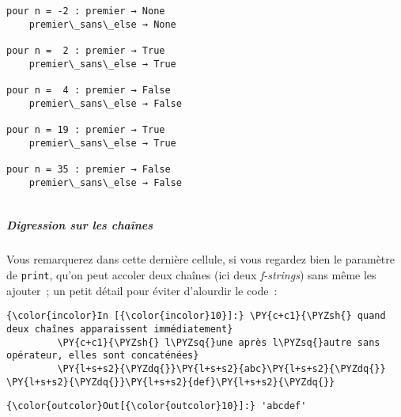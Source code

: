     \begin{Verbatim}[commandchars=\\\{\}]
pour n = -2 : premier → None
    premier\_sans\_else → None

pour n =  2 : premier → True
    premier\_sans\_else → True

pour n =  4 : premier → False
    premier\_sans\_else → False

pour n = 19 : premier → True
    premier\_sans\_else → True

pour n = 35 : premier → False
    premier\_sans\_else → False


    \end{Verbatim}

    \hypertarget{digression-sur-les-chauxeenes}{%
\subparagraph{Digression sur les
chaînes}\label{digression-sur-les-chauxeenes}}

    Vous remarquerez dans cette dernière cellule, si vous regardez bien le
paramètre de \texttt{print}, qu'on peut accoler deux chaînes (ici deux
\emph{f-strings}) sans même les ajouter~; un petit détail pour éviter
d'alourdir le code~:

    \begin{Verbatim}[commandchars=\\\{\}]
{\color{incolor}In [{\color{incolor}10}]:} \PY{c+c1}{\PYZsh{} quand deux chaînes apparaissent immédiatement}
         \PY{c+c1}{\PYZsh{} l\PYZsq{}une après l\PYZsq{}autre sans opérateur, elles sont concaténées}
         \PY{l+s+s2}{\PYZdq{}}\PY{l+s+s2}{abc}\PY{l+s+s2}{\PYZdq{}} \PY{l+s+s2}{\PYZdq{}}\PY{l+s+s2}{def}\PY{l+s+s2}{\PYZdq{}}
\end{Verbatim}


\begin{Verbatim}[commandchars=\\\{\}]
{\color{outcolor}Out[{\color{outcolor}10}]:} 'abcdef'
\end{Verbatim}